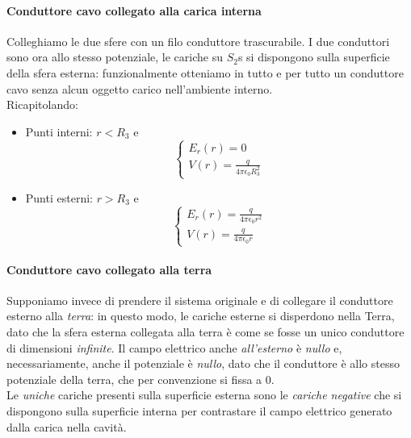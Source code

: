 \paragraph{Conduttore cavo collegato alla carica interna}
Colleghiamo le due sfere con un filo conduttore trascurabile. I due conduttori sono ora allo stesso potenziale, le cariche su $S_2$s si dispongono sulla superficie della sfera esterna: funzionalmente otteniamo in tutto e per tutto un conduttore cavo senza alcun oggetto carico nell'ambiente interno.\\
Ricapitolando:
\begin{itemize}
	\item Punti interni: $r<R_3$ e
	\begin{equation*}
		\begin{cases}
			E_{r}(r)=0\\
			V(r)=\frac{q}{4\pi\epsilon_0R_3^2}
		\end{cases}
	\end{equation*}
	\item Punti esterni: $r>R_3$ e
	\begin{equation*}
		\begin{cases}
			E_{r}(r)=\frac{q}{4\pi\epsilon_0 r^2}\\
			V(r)=\frac{q}{4\pi\epsilon_0r}
		\end{cases}
	\end{equation*}
\end{itemize}

\paragraph{Conduttore cavo collegato alla terra}
Supponiamo invece di prendere il sistema originale e di collegare il conduttore esterno alla \textit{terra}: in questo modo, le cariche esterne si disperdono nella Terra, dato che la sfera esterna collegata alla terra è come se fosse un unico conduttore di dimensioni \textit{infinite}. Il campo elettrico anche \textit{all'esterno} è \textit{nullo} e, necessariamente, anche il potenziale è \textit{nullo}, dato che il conduttore è allo stesso potenziale della terra, che per convenzione si fissa a 0.\\
Le \textit{uniche} cariche presenti sulla superficie esterna sono le \textit{cariche negative} che si dispongono sulla superficie interna per contrastare il campo elettrico generato dalla carica nella cavità.\\

